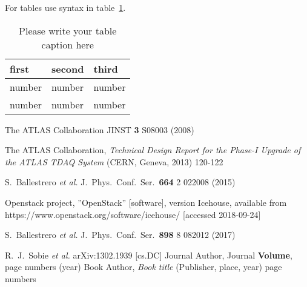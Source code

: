 \documentclass{webofc}
\begin{document}
For tables use syntax in table~\ref{tab-1}.
\begin{table}
\centering
\caption{Please write your table caption here}
\label{tab-1}       %
\begin{tabular}{lll}
\hline
first & second & third  \\\hline
number & number & number \\
number & number & number \\\hline
\end{tabular}
\vspace*{5cm}  %
\end{table}
%
% 
%
%
\begin{thebibliography}{}
   The ATLAS Collaboration
   JINST \textbf{3} S08003 (2008)

  The ATLAS Collaboration, \textit{Technical Design Report for the Phase-I Upgrade of the ATLAS TDAQ System} (CERN, Geneva, 2013) 120-122

    S.~Ballestrero {\it et al.}
    J.\ Phys.\ Conf.\ Ser.\  {\bf 664} 2  022008 (2015)

  Openstack project, ”OpenStack” [software], version Icehouse, available from\linebreak
  https://www.openstack.org/software/icehouse/ [accessed 2018-09-24]

    S.~Ballestrero {\it et al.}
    J.\ Phys.\ Conf.\ Ser.\  {\bf 898}  8 082012 (2017)

    R.~J.~Sobie {\it et al.}
    arXiv:1302.1939 [cs.DC]
%
%
Journal Author, Journal \textbf{Volume}, page numbers (year)
Book Author, \textit{Book title} (Publisher, place, year) page numbers
\end{thebibliography}
\end{document}
